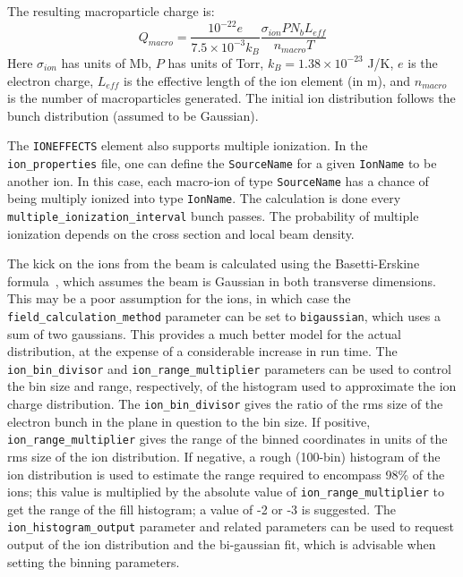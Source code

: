 The resulting macroparticle charge is:
\begin{equation}
Q_{macro} = \frac{10^{-22} e}{7.5\times10^{-3} k_B} \frac{\sigma_{ion} P N_b L_{eff}}{n_{macro} T}
\end{equation}
Here $\sigma_{ion}$ has units of Mb, $P$ has units of Torr, $k_B = 1.38\times10^{-23}$ J/K, $e$ is the electron charge, $L_{eff}$ is the effective length of the ion element (in m), and $n_{macro}$ is the number of macroparticles generated.
The initial ion distribution follows the bunch distribution (assumed to be Gaussian).

The \verb|IONEFFECTS| element also supports multiple ionization.  In the \verb|ion_properties| file, one can define the \verb|SourceName| for a given \verb|IonName| to be another ion.  In this case, each macro-ion of type \verb|SourceName| has a chance of being multiply ionized into type \verb|IonName|.  The calculation is done every \verb|multiple_ionization_interval| bunch passes.  The probability of multiple ionization depends on the cross section and local beam density.



The kick on the ions from the beam is calculated using the
Basetti-Erskine formula~\cite{Bassetti}, which assumes the beam is
Gaussian in both transverse dimensions.  This may be a poor assumption for
the ions, in which case the \verb|field_calculation_method| parameter can be
set to \verb|bigaussian|, which uses a sum of two gaussians. This provides
a much better model for the actual distribution, at the expense of a considerable
increase in run time. The \verb|ion_bin_divisor| and \verb|ion_range_multiplier| parameters can
be used to control the bin size and range, respectively, of the histogram used to 
approximate the ion charge distribution.
The \verb|ion_bin_divisor| gives the ratio of the rms size of the electron bunch
in the plane in question to the bin size.
If positive, \verb|ion_range_multiplier| gives the range of the binned coordinates in 
units of the rms size of the ion distribution.
If negative, a rough (100-bin) histogram of the ion distribution is used to
estimate the range required to encompass 98\% of the ions; this value is multiplied
by the absolute value of \verb|ion_range_multiplier| to get the range of the
fill histogram; a value of -2 or -3 is suggested.
The \verb|ion_histogram_output| parameter and related parameters can be used to 
request output of the ion distribution and the bi-gaussian fit, which is advisable
when setting the binning parameters.

